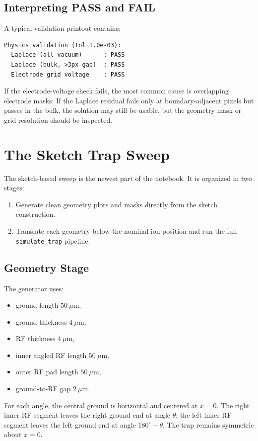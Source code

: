 \documentclass[11pt]{article}
\begin{document}
\subsection{Interpreting PASS and FAIL}

A typical validation printout contains:
\begin{lstlisting}
Physics validation (tol=1.0e-03):
  Laplace (all vacuum)      : PASS
  Laplace (bulk, >3px gap)  : PASS
  Electrode grid voltage    : PASS
\end{lstlisting}
If the electrode-voltage check fails, the most common cause is overlapping
electrode masks. If the Laplace residual fails only at boundary-adjacent pixels
but passes in the bulk, the solution may still be usable, but the geometry mask
or grid resolution should be inspected.

\newpage

\section{The Sketch Trap Sweep}

The sketch-based sweep is the newest part of the notebook. It is organized in
two stages:
\begin{enumerate}[label=\arabic*.]
  \item Generate clean geometry plots and masks directly from the sketch
        construction.
  \item Translate each geometry below the nominal ion position and run the
        full \texttt{simulate\_trap} pipeline.
\end{enumerate}

\subsection{Geometry Stage}

The generator uses:
\begin{itemize}
  \item ground length \(50\ \mu\mathrm{m}\),
  \item ground thickness \(4\ \mu\mathrm{m}\),
  \item RF thickness \(4\ \mu\mathrm{m}\),
  \item inner angled RF length \(50\ \mu\mathrm{m}\),
  \item outer RF pad length \(50\ \mu\mathrm{m}\),
  \item ground-to-RF gap \(2\ \mu\mathrm{m}\).
\end{itemize}
For each angle, the central ground is horizontal and centered at \(x=0\).
The right inner RF segment leaves the right ground end at angle \(\theta\);
the left inner RF segment leaves the left ground end at angle
\(180^\circ-\theta\). The trap remains symmetric about \(x=0\).
\end{document}
